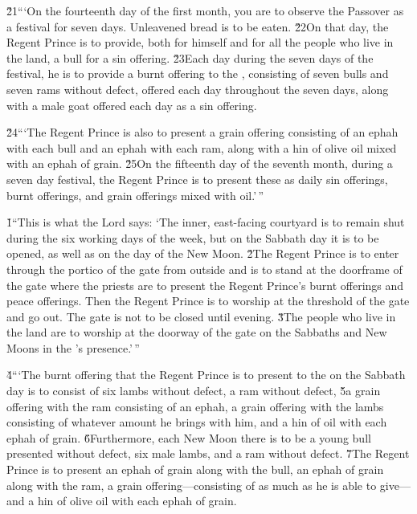 \v{21}```On the fourteenth day of the first month, you are to observe the Passover as a festival for seven days. Unleavened bread is to be eaten. \v{22}On that day, the Regent Prince is to provide, both for himself and for all the people who live in the land, a bull for a sin offering. \v{23}Each day during the seven days of the festival, he is to provide a burnt offering to the , consisting of seven bulls and seven rams without defect, offered each day throughout the seven days, along with a male goat offered each day as a sin offering.

\v{24}```The Regent Prince is also to present a grain offering consisting of an ephah with each bull and an ephah with each ram, along with a hin of olive oil mixed with an ephah of grain. \v{25}On the fifteenth day of the seventh month, during a seven day festival, the Regent Prince is to present these as daily sin offerings, burnt offerings, and grain offerings mixed with oil.'\,''

\v{1}``This is what the Lord  says: `The inner, east-facing courtyard is to remain shut during the six working days of the week, but on the Sabbath day it is to be opened, as well as on the day of the New Moon. \v{2}The Regent Prince is to enter through the portico of the gate from outside and is to stand at the doorframe of the gate where the priests are to present the Regent Prince's burnt offerings and peace offerings. Then the Regent Prince is to worship at the threshold of the gate and go out. The gate is not to be closed until evening. \v{3}The people who live in the land are to worship at the doorway of the gate on the Sabbaths and New Moons in the 's presence.'\,''

\v{4}```The burnt offering that the Regent Prince is to present to the  on the Sabbath day is to consist of six lambs without defect, a ram without defect, \v{5}a grain offering with the ram consisting of an ephah, a grain offering with the lambs consisting of whatever amount he brings with him, and a hin of oil with each ephah of grain. \v{6}Furthermore, each New Moon there is to be a young bull presented without defect, six male lambs, and a ram without defect. \v{7}The Regent Prince is to present an ephah of grain along with the bull, an ephah of grain along with the ram, a grain offering---consisting of as much as he is able to give---and a hin of olive oil with each ephah of grain.

